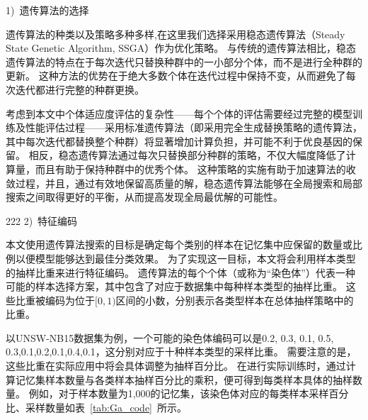 1)~遗传算法的选择\par
遗传算法的种类以及策略多种多样,在这里我们选择采用稳态遗传算法（Steady State Genetic Algorithm, SSGA）作为优化策略。
与传统的遗传算法相比，稳态遗传算法的特点在于每次迭代只替换种群中的一小部分个体，而不是进行全种群的更新。
这种方法的优势在于绝大多数个体在迭代过程中保持不变，从而避免了每次迭代都进行完整的种群更换。\par

考虑到本文中个体适应度评估的复杂性——每个个体的评估需要经过完整的模型训练及性能评估过程——采用标准遗传算法（即采用完全生成替换策略的遗传算法，其中每次迭代都替换整个种群）将显著增加计算负担，并可能不利于优良基因的保留。
相反，稳态遗传算法通过每次只替换部分种群的策略，不仅大幅度降低了计算量，而且有助于保持种群中的优秀个体。
这种策略的实施有助于加速算法的收敛过程，并且，通过有效地保留高质量的解，稳态遗传算法能够在全局搜索和局部搜索之间取得更好的平衡，从而提高发现全局最优解的可能性。\par
                                                                                     222
2)~特征编码\par
本文使用遗传算法搜索的目标是确定每个类别的样本在记忆集中应保留的数量或比例以便模型能够达到最佳分类效果。
为了实现这一目标，本文将会利用样本类型的抽样比重来进行特征编码。
遗传算法的每个个体（或称为“染色体”）代表一种可能的样本选择方案，其中包含了对应于数据集中每种样本类型的抽样比重。
这些比重被编码为位于$[0,1)$区间的小数，分别表示各类型样本在总体抽样策略中的比重。\par
以UNSW-NB15数据集为例，一个可能的染色体编码可以是{0.2, 0.3, 0.1, 0.5, 0.3,0.1,0.2,0.1,0.4,0.1}，这分别对应于十种样本类型的采样比重。
需要注意的是，这些比重在实际应用中将会具体调整为抽样百分比。
在进行实际训练时，通过计算记忆集样本数量与各类样本抽样百分比的乘积，便可得到每类样本具体的抽样数量。
例如，对于样本数量为1,000的记忆集，该染色体对应的每类样本采样百分比、采样数量如表~\ref{tab:Ga_code}~所示。\par
